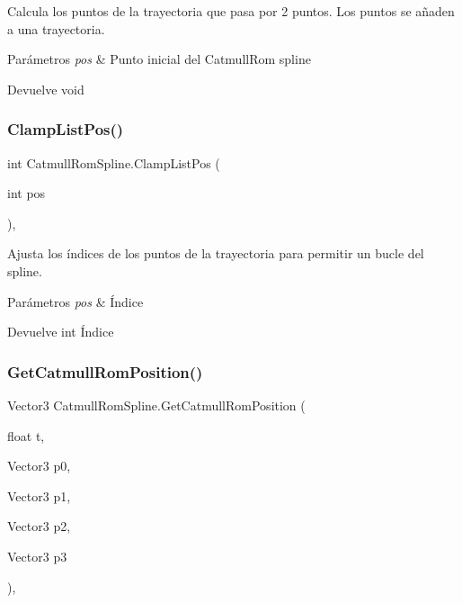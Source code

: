 Calcula los puntos de la trayectoria que pasa por 2 puntos. Los puntos se añaden a una trayectoria. 
\begin{DoxyParams}{Parámetros}
{\em pos} & Punto inicial del Catmull\+Rom spline \\
\hline
\end{DoxyParams}
\begin{DoxyReturn}{Devuelve}
void 
\end{DoxyReturn}
\mbox{\label{class_catmull_rom_spline_a3ba7de330679168566750a9dfdc42534}} 
\subsubsection{\texorpdfstring{ClampListPos()}{ClampListPos()}}
{\footnotesize\ttfamily int Catmull\+Rom\+Spline.\+Clamp\+List\+Pos (\begin{DoxyParamCaption}\item[{int}]{pos }\end{DoxyParamCaption})\hspace{0.3cm}{\ttfamily [inline]}, {\ttfamily [private]}}

Ajusta los índices de los puntos de la trayectoria para permitir un bucle del spline. 
\begin{DoxyParams}{Parámetros}
{\em pos} & Índice \\
\hline
\end{DoxyParams}
\begin{DoxyReturn}{Devuelve}
int Índice 
\end{DoxyReturn}
\mbox{\label{class_catmull_rom_spline_ad15822896d9310c20eba4b395220411c}} 
\subsubsection{\texorpdfstring{GetCatmullRomPosition()}{GetCatmullRomPosition()}}
{\footnotesize\ttfamily Vector3 Catmull\+Rom\+Spline.\+Get\+Catmull\+Rom\+Position (\begin{DoxyParamCaption}\item[{float}]{t,  }\item[{Vector3}]{p0,  }\item[{Vector3}]{p1,  }\item[{Vector3}]{p2,  }\item[{Vector3}]{p3 }\end{DoxyParamCaption})\hspace{0.3cm}{\ttfamily [inline]}, {\ttfamily [private]}}

